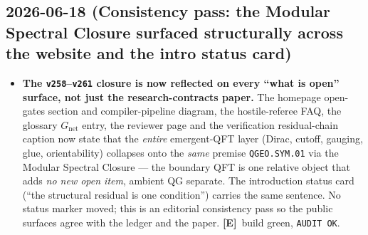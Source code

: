 \documentclass[11pt]{article}
\providecommand{\mE}{\textbf{[E]}}\providecommand{\mC}{\textbf{[C]}}
\begin{document}
\subsection*{2026-06-18 (Consistency pass: the Modular Spectral Closure surfaced structurally across the website and the intro status card)}
\begin{itemize}
\item \textbf{The \texttt{v258}--\texttt{v261} closure is now reflected on every ``what is open'' surface, not just the
  research-contracts paper.} The homepage open-gates section and compiler-pipeline diagram, the hostile-referee
  FAQ, the glossary $G_{\mathrm{net}}$ entry, the reviewer page and the verification residual-chain caption now
  state that the \emph{entire} emergent-QFT layer (Dirac, cutoff, gauging, glue, orientability) collapses onto
  the \emph{same} premise \texttt{QGEO.SYM.01} via the Modular Spectral Closure --- the boundary QFT is one
  relative object that adds \emph{no new open item}, ambient QG separate. The introduction status card
  (``the structural residual is one condition'') carries the same sentence. No status marker moved; this is an
  editorial consistency pass so the public surfaces agree with the ledger and the paper. \mE\ build green,
  \texttt{AUDIT OK}.
\end{itemize}
\end{document}
